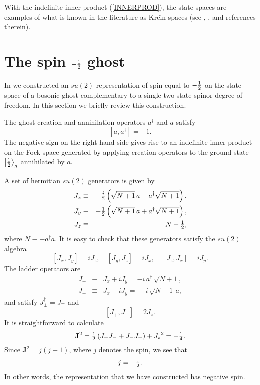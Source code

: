 \documentclass[a4paper,dvips,12pt]{article}
\newcommand {\half} {{1 \over 2}}
\newcommand {\hhalf} {{\textstyle{1 \over 2}}}
\newcommand {\ket}[1] {\left| #1 \right>}
\begin{document}
    With the indefinite inner product
    (\ref{INNERPROD}), the state spaces are examples of
    what is known in the literature as Kre\u{\i}n spaces (see
    \cite{BOGNAR}, \cite{MALCEV}, \cite{JACOBZYK} and references therein).

    \section{The spin $-\half$ ghost}

    In \cite{MYSELF} we constructed an $su(2)$ representation of
    spin equal to $-\half$ on the state space of a bosonic ghost
    complementary to a single two-state spinor degree of freedom.
    In this section we briefly review this construction.

    The ghost creation and annihilation
    operators $a^\dagger$ and $a$ satisfy
    \[
        [a, a^\dagger] = -1.
    \]
    The negative sign on the right hand side gives rise to an
    indefinite inner product on
    the Fock space generated by applying creation operators
    to the ground state $\ket{\half}_g$
    annihilated by $a$.

    A set of hermitian $su(2)$ generators
    is given by
    \begin{eqnarray}
        J_x &\equiv &\phantom{-}{\textstyle {i \over 2}} \left( \sqrt{N+1}\, a -
        a^\dagger
            \sqrt{N+1}\right),
        \nonumber\\
        J_y &\equiv &- {\hhalf} \left( \sqrt{N+1}\, a + a^\dagger
            \sqrt{N+1}\right),
         \nonumber \\
        J_z &\equiv & N + {\hhalf}, \label{LIE}
    \end{eqnarray}
    where $N \equiv -a^\dagger a$.
    It is easy to check that these generators satisfy the $su(2)$ algebra
    \[
        [J_x, J_y] = iJ_z,\quad [J_y, J_z] = iJ_x,\quad [J_z, J_x] =
        iJ_y.
    \]
    The ladder operators are
    \begin{eqnarray}
        J_+ &\equiv &J_x + iJ_y = -i\,a^\dagger \, \sqrt {N+1}, \nonumber \\
        J_- &\equiv &J_x - iJ_y = \phantom{-} i\,\sqrt {N+1}\,a, \nonumber
    \end{eqnarray}
    and satisfy $J_\pm^\dagger = J_\mp$ and
    \[
        [J_+, J_-] = 2 J_z.
    \]
    It is straightforward to calculate
    \[
        \mathbf{J}^2 = {\hhalf} \left( J_+ J_- + J_- J_+ \right) +
        {J_z}^2 = - {\textstyle {1 \over 4}}.
    \]
    Since $\mathbf{J}^2 = j(j+1)$, where $j$ denotes the spin, we
    see that
    \[
        j = -{\hhalf}.
    \]
    In other words, the representation that we have constructed
    has negative spin.
\end{document}
